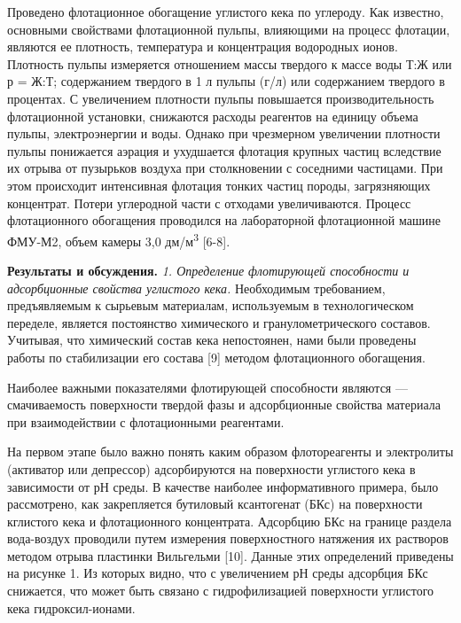 \begin{multicols}{2}
Проведено флотационное обогащение углистого кека по углероду. Как
известно, основными свойствами флотационной пульпы, влияющими на процесс
флотации, являются ее плотность, температура и концентрация водородных
ионов. Плотность пульпы измеряется отношением массы твердого к массе
воды Т:Ж или р = Ж:Т; содержанием твердого в 1 л пульпы (г/л) или
содержанием твердого в процентах. С увеличением плотности пульпы
повышается производительность флотационной установки, снижаются расходы
реагентов на единицу объема пульпы, электроэнергии и воды. Однако при
чрезмерном увеличении плотности пульпы понижается аэрация и ухудшается
флотация крупных частиц вследствие их отрыва от пузырьков воздуха при
столкновении с соседними частицами. При этом происходит интенсивная
флотация тонких частиц породы, загрязняющих концентрат. Потери
углеродной части с отходами увеличиваются. Процесс флотационного
обогащения проводился на лабораторной флотационной машине ФМУ-М2, объем
камеры 3,0 дм/м\textsuperscript{3} {[}6-8{]}.

{\bfseries Результаты и обсуждения.} \emph{1. Определение флотирующей
способности и адсорбционные свойства углистого кека.} Необходимым
требованием, предъявляемым к сырьевым материалам, используемым в
технологическом переделе, является постоянство химического и
гранулометрического составов. Учитывая, что химический состав кека
непостоянен, нами были проведены работы по стабилизации его состава
{[}9{]} методом флотационного обогащения.

Наиболее важными показателями флотирующей способности являются ---
смачиваемость поверхности твердой фазы и адсорбционные свойства
материала при взаимодействии с флотационными реагентами.

На первом этапе было важно понять каким образом флотореагенты и
электролиты (активатор или депрессор) адсорбируются на поверхности
углистого кека в зависимости от рН среды. В качестве наиболее
информативного примера, было рассмотрено, как закрепляется бутиловый
ксантогенат (БКс) на поверхности кглистого кека и флотационного
концентрата. Адсорбцию БКс на границе раздела вода-воздух проводили
путем измерения поверхностного натяжения их растворов методом отрыва
пластинки Вильгельми {[}10{]}. Данные этих определений приведены на
рисунке 1. Из которых видно, что с увеличением рН среды адсорбция БКс
снижается, что может быть связано с гидрофилизацией поверхности
углистого кека гидроксил-ионами.
\end{multicols}


